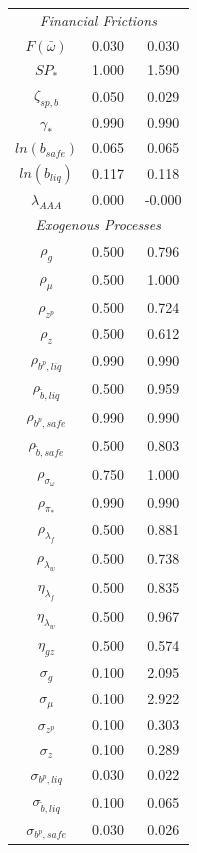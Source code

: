 \documentclass[12pt]{article}
\begin{document}
\begin{longtable}{ccc}
\multicolumn{7}{c}{\textit{Financial Frictions}} \\[3pt]
$ F(\bar{\omega})$ &    0.030 & \   0.030 \\
$ SP_*$ &    1.000 & \   1.590 \\
$ \zeta_{sp,b}$ &    0.050 & \   0.029 \\
$ \gamma_*$ &    0.990 & \   0.990 \\
$ ln(b_{safe})$ &    0.065 & \   0.065 \\
$ ln(b_{liq})$ &    0.117 & \   0.118 \\
$ \lambda_{AAA}$ &    0.000 & \  -0.000 \\
\multicolumn{7}{c}{\textit{Exogenous Processes}} \\[3pt]
$ \rho_g$ &    0.500 & \   0.796 \\
$ \rho_{\mu}$ &    0.500 & \   1.000 \\
$ \rho_{z^p}$ &    0.500 & \   0.724 \\
$ \rho_z$ &    0.500 & \   0.612 \\
$ \rho_{b^p,liq}$ &    0.990 & \   0.990 \\
$ \rho_{\tilde{b},liq}$ &    0.500 & \   0.959 \\
$ \rho_{b^p,safe}$ &    0.990 & \   0.990 \\
$ \rho_{\tilde{b},safe}$ &    0.500 & \   0.803 \\
$ \rho_{\sigma_\omega}$ &    0.750 & \   1.000 \\
$ \rho_{\pi_*}$ &    0.990 & \   0.990 \\
$ \rho_{\lambda_f}$ &    0.500 & \   0.881 \\
$ \rho_{\lambda_w}$ &    0.500 & \   0.738 \\
$ \eta_{\lambda_f}$ &    0.500 & \   0.835 \\
$ \eta_{\lambda_w}$ &    0.500 & \   0.967 \\
$ \eta_{gz}$ &    0.500 & \   0.574 \\
$ \sigma_{g}$ &    0.100 & \   2.095 \\
$ \sigma_{\mu}$ &    0.100 & \   2.922 \\
$ \sigma_{z^p}$ &    0.100 & \   0.303 \\
$ \sigma_{z}$ &    0.100 & \   0.289 \\
$ \sigma_{b^p, liq}$ &    0.030 & \   0.022 \\
$ \sigma_{\tilde{b}, liq}$ &    0.100 & \   0.065 \\
$ \sigma_{b^p, safe}$ &    0.030 & \   0.026 \\

\end{longtable}
\end{document}
